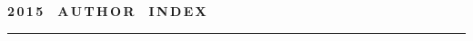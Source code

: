 
\def\stat{cont-e}
{%
\raggedleft\Large \bf%
2\,0\,1\,5\ \ A\,U\,T\,H\,O\,R\ \ I\,N\,D\,E\,X \vskip 17pt
    \hrule
    \par
{} }

\label{st\stat}

\def\tit{\ }

\def\aut{\ }
\def\auf{\ }

\def\leftkol{\ } %

\def\rightkol{\ } %

\titele{\tit}{\aut}{\auf}{\leftkol}{\rightkol}

\def\leftfootline{\small{\textbf{\thepage}
\hfill INFORMATIKA I EE PRIMENENIYA~--- INFORMATICS AND APPLICATIONS\ \ \ 2015\
\ \ volume~9\ \ \ issue\ 4}
}%
 \def\rightfootline{\small{INFORMATIKA I EE PRIMENENIYA~--- INFORMATICS AND APPLICATIONS\ \ \ 2015\ \ \ volume~9\ \ \ issue\ 4
\hfill \textbf{\thepage}}}

\vspace*{-12pt}
\vspace*{-18pt}

